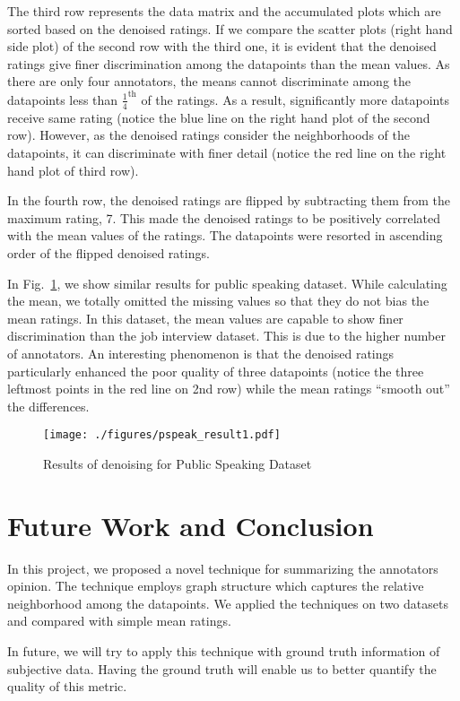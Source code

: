 \documentclass{article} \usepackage{nips14submit_e,times}
\begin{document}
The third row represents the data matrix and the accumulated plots which are sorted based on the denoised ratings. If we compare the scatter plots (right hand side plot) of the second row with the third one, it is evident that the denoised ratings give finer discrimination among the datapoints than the mean values. As there are only four annotators, the means cannot discriminate among the datapoints less than $\frac{1}{4}^{\text{th}}$ of the ratings. As a result, significantly more datapoints receive same rating (notice the blue line on the right hand plot of the second row). However, as the denoised ratings consider the neighborhoods of the datapoints, it can discriminate with finer detail (notice the red line on the right hand plot of third row).

In the fourth row, the denoised ratings are flipped by subtracting them from the maximum rating, 7. This made the denoised ratings to be positively correlated with the mean values of the ratings. The datapoints were resorted in ascending order of the flipped denoised ratings. 

In Fig.~\ref{Fig:pspeak_result}, we show similar results for public speaking dataset. While calculating the mean, we totally omitted the missing values so that they do not bias the mean ratings. In this dataset, the mean values are capable to show finer discrimination than the job interview dataset. This is due to the higher number of annotators. An interesting phenomenon is that the denoised ratings particularly enhanced the poor quality of three datapoints (notice the three leftmost points in the red line on 2nd row) while the mean ratings ``smooth out'' the differences. 
\begin{figure}
\centering
\texttt{[image: ./figures/pspeak\_result1.pdf]}
\caption{Results of denoising for Public Speaking Dataset}\label{Fig:pspeak_result}
\end{figure}

\section{Future Work and Conclusion}
In this project, we proposed a novel technique for summarizing the annotators opinion. The technique employs graph structure which captures the relative neighborhood among the datapoints. We applied the techniques on two datasets and compared with simple mean ratings.

In future, we will try to apply this technique with ground truth information of subjective data. Having the ground truth will enable us to better quantify the quality of this metric.



\end{document}

